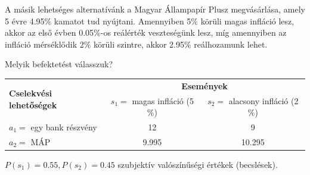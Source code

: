 \documentclass[a4paper,12pt]{article}
\begin{document}
A másik lehetséges alternatívánk a Magyar Állampapír Plusz megvásárlása, amely 5 évre 4.95$\%$ kamatot tud nyújtani. Amennyiben 5$\%$ körüli magas infláció lesz, akkor az első évben 0.05$\%$-os reálérték veszteségünk lesz, míg amennyiben az infláció mérséklődik 2$\%$ körüli szintre, akkor 2.95$\%$ reálhozamunk lehet.

Melyik befektetést válasszuk?

\begin{center}
\begin{tabular}{l|c|c}
\multirow{2}{*}{\bf Cselekvési lehetőségek } &  \multicolumn{2}{c}{ \bf Események }\\
 & $s_1=$ magas infláció (5$\%$) & $s_2=$ alacsony infláció (2$\%$) \\
\hline
  $a_1=$ egy bank részvény & 12 & 9 \\
  $a_2=$ MÁP & 9.995 & 10.295 \\
\end{tabular}
\end{center}
$P(s_1) = 0.55 , P(s_2) = 0.45$ szubjektív valószínűségi értékek (becslések).





\end{document}
